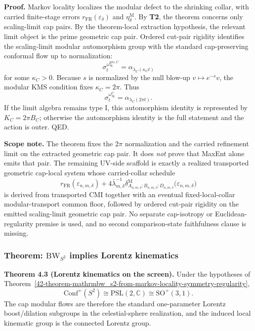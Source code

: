 \textbf{Proof.} Markov locality localizes the modular defect to the shrinking collar, with carried finite-stage errors \(r_{\mathrm{FR}}(\varepsilon_\delta)\) and \(\eta_\delta^{\mathrm M}\). By \textbf{T2}, the theorem concerns only scaling-limit cap pairs. By the theorem-local extraction hypothesis, the relevant limit object is the prime geometric cap pair. Ordered cut-pair rigidity identifies the scaling-limit modular automorphism group with the standard cap-preserving conformal flow up to normalization:
\[
\sigma_t^{\omega_\infty^{\mathrm{geo},C}}
=
\alpha_{\lambda_C(\kappa_C t)}
\]
for some \(\kappa_C>0\). Because \(s\) is normalized by the null blow-up \(v\mapsto e^{-s}v\), the modular KMS condition fixes \(\kappa_C=2\pi\). Thus
\[
\sigma_t^{\omega_\infty^C}
=
\alpha_{\lambda_C(2\pi t)}.
\]
If the limit algebra remains type I, this automorphism identity is represented by \(K_C=2\pi B_C\); otherwise the automorphism identity is the full statement and the action is outer. QED.

\textbf{Scope note.} The theorem fixes the \(2\pi\) normalization and the carried refinement limit on the extracted geometric cap pair. It does \emph{not} prove that MaxEnt alone emits that pair. The remaining UV-side scaffold is exactly a realized transported geometric cap-local system whose carried-collar schedule
\[
r_{\mathrm{FR}}(\varepsilon_{n,m,\delta})
+
4\bar\lambda_{m,\delta}^{-1}
\delta^{\mathrm{M}}_{A_{n,m,\delta}:B_{n,m,\delta}:D_{n,m,\delta}}
\bigl(\varepsilon_{n,m,\delta}\bigr)
\]
is derived from transported CMI together with an eventual fixed-local-collar modular-transport common floor, followed by ordered cut-pair rigidity on the emitted scaling-limit geometric cap pair. No separate cap-isotropy or Euclidean-regularity premise is used, and no second comparison-state faithfulness clause is missing.
\subsubsection{\texorpdfstring{Theorem: \(\mathrm{BW}_{S^2}\) implies Lorentz kinematics}{4.3 Theorem: \textbackslash mathrm\{BW\}\_\{S\^{}2\} implies Lorentz kinematics}}\label{43-theorem-mathrmbw_s2-implies-lorentz-kinematics}

\textbf{Theorem 4.3 (Lorentz kinematics on the screen).} Under the hypotheses of Theorem~\ref{42-theorem-mathrmbw_s2-from-markov-locality-symmetry-regularity},
\[
\mathrm{Conf}^+(S^2)\cong \mathrm{PSL}(2,\mathbb C)\cong \mathrm{SO}^+(3,1).
\]
The cap modular flows are therefore the standard one-parameter Lorentz boost/dilation subgroups in the celestial-sphere realization, and the induced local kinematic group is the connected Lorentz group.

